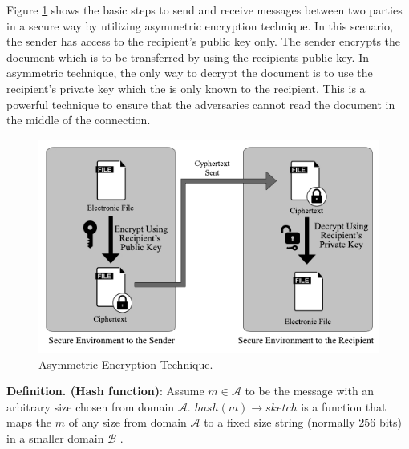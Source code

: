 Figure \ref{fig:AssymmetricEncryption} shows the basic steps to send and receive messages between two parties in a secure way by utilizing asymmetric encryption technique. In this scenario, the sender has access to the recipient's public key only. The sender encrypts the document which is to be transferred by using the recipients public key. In asymmetric technique, the only way to decrypt the document is to use the recipient's private key which the is only known to the recipient. This is a powerful technique to ensure that the adversaries cannot read the document in the middle of the connection.

\begin{figure}
	\label{fig:AssymmetricEncryption}
	\centering
	\includegraphics[width=\textwidth]{figs/asymmetricEncryption.pdf}
	\caption{Asymmetric Encryption Technique.}
\end{figure}
\textbf{Definition. (Hash function)}: Assume $m \in \mathcal{A}$ to be the message with an arbitrary size chosen from domain $\mathcal{A}$. $hash(m)\rightarrow sketch$ 
is a function that maps the $m$ of any size from domain $\mathcal{A}$ to a fixed size string (normally 256 bits) in a smaller domain $\mathcal{B}$ \cite{aumasson2014thehash}.


